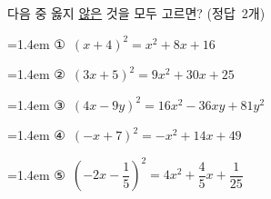 다음 중 옳지 \underline{않은} 것을 모두 고르면? \mbox{(정답 2개)}
\par\medskip\par\noindent\hangindent=1.4em {\small ①}\ $(x+4)^2=x^2+8x+16$\par\noindent\hangindent=1.4em {\small ②}\ $(3x+5)^2=9x^2+30x+25$\par\noindent\hangindent=1.4em {\small ③}\ $(4x-9y)^2=16x^2-36xy+81y^2$\par\noindent\hangindent=1.4em {\small ④}\ $(-x+7)^2=-x^2+14x+49$\par\noindent\hangindent=1.4em {\small ⑤}\ $\left(-2x-\dfrac{1}{5}\right)^2=4x^2+\dfrac{4}{5}x+\dfrac{1}{25}$\par\medskip
